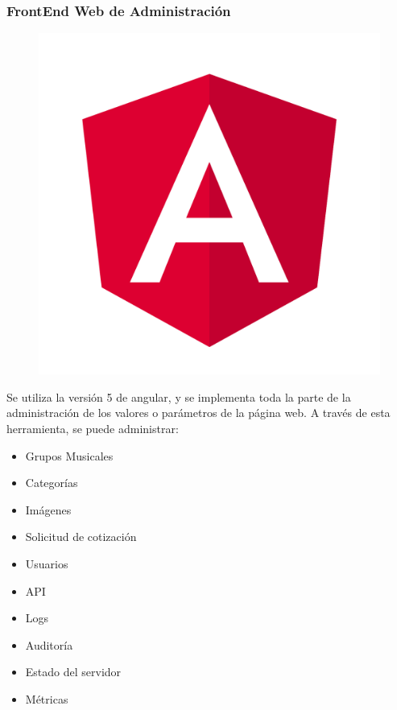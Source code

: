 \subsubsection{FrontEnd Web de Administración}

\begin{figure}[h!]
 \centering
\includegraphics[width=0.1\linewidth]{Desarrollo/Arquitectura/imgs/Angular_full_color_logo.png}
\end{figure}

Se utiliza la versión 5 de angular, y se implementa toda la parte de la administración de los valores o parámetros de la página web. A través de esta herramienta, se puede administrar:

\begin{itemize}[noitemsep]
\item Grupos Musicales
\item Categorías
\item Imágenes
\item Solicitud de cotización
\item Usuarios
\item API
\item Logs
\item Auditoría
\item Estado del servidor
\item Métricas
\end{itemize}

\newpage

